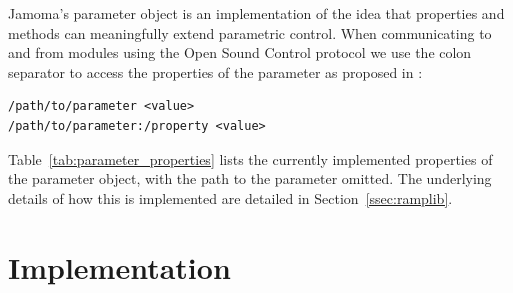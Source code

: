\documentclass{article}
\begin{document}
Jamoma's parameter object is an implementation of the idea that properties and methods can meaningfully extend parametric control. When communicating to and from modules using the Open Sound Control protocol \cite{Wright:2003} we use the colon separator to access the properties of the parameter as proposed in \cite{Place:2008}:

\begin{small}
\begin{verbatim}
/path/to/parameter <value>
/path/to/parameter:/property <value>
\end{verbatim}
\end{small}

Table~\ref{tab:parameter_properties} lists the currently implemented properties of the parameter object, with the path to the parameter omitted. The underlying details of how this is implemented are detailed in Section~\ref{ssec:ramplib}.



%
%
%
%
%





\section{Implementation} %
\label{sec:param_implementation}
\end{document}

